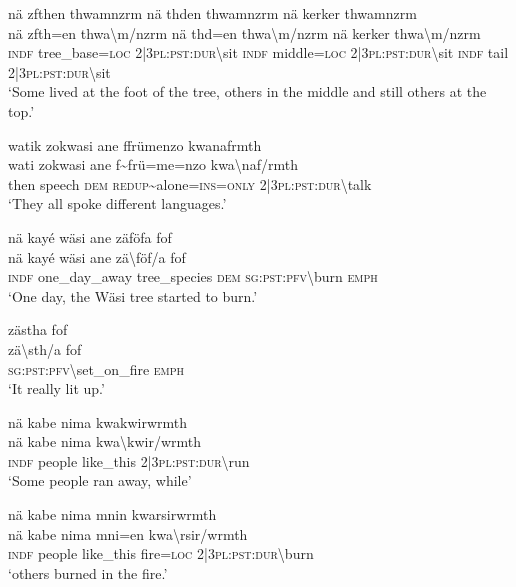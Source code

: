 \ea\label{ex:1:a3502}
nä zfthen thwamnzrm nä thden thwamnzrm nä kerker thwamnzrm\\
\gll nä	zfth=en	thwa{\textbackslash}m/nzrm	nä	thd=en	thwa{\textbackslash}m/nzrm	nä	kerker	thwa{\textbackslash}m/nzrm\\
     \textsc{indf}	tree\_base=\textsc{loc}	2|3\textsc{pl}:\textsc{pst}:\textsc{dur}{\textbackslash}sit	\textsc{indf}	middle=\textsc{loc}	2|3\textsc{pl}:\textsc{pst}:\textsc{dur}{\textbackslash}sit	\textsc{indf}	tail	2|3\textsc{pl}:\textsc{pst}:\textsc{dur}{\textbackslash}sit\\
\glt `Some lived at the foot of the tree, others in the middle and still others at the top.'
\z

\ea\label{ex:1:a3504}
watik zokwasi ane ffrümenzo kwanafrmth\\
\gll wati	zokwasi	ane	f{\textasciitilde}frü=me=nzo	kwa{\textbackslash}naf/rmth\\
     then	speech	\textsc{dem}	\textsc{redup}{\textasciitilde}alone=\textsc{ins}=\textsc{only}	2|3\textsc{pl}:\textsc{pst}:\textsc{dur}{\textbackslash}talk\\
\glt `They all spoke different languages.'
\z

\ea\label{ex:1:a3505}
nä kayé wäsi ane zäföfa fof\\
\gll nä	kayé	wäsi	ane	zä{\textbackslash}föf/a	fof\\
     \textsc{indf}	one\_day\_away	tree\_species	\textsc{dem}	\textsc{sg}:\textsc{pst}:\textsc{pfv}{\textbackslash}burn	\textsc{emph}\\
\glt `One day, the Wäsi tree started to burn.'
\z

\ea\label{ex:1:a3507}
zästha fof\\
\gll zä{\textbackslash}sth/a	fof\\
     \textsc{sg}:\textsc{pst}:\textsc{pfv}{\textbackslash}set\_on\_fire	\textsc{emph}\\
\glt `It really lit up.'
\z

\ea\label{ex:1:a3508}
nä kabe nima kwakwirwrmth\\
\gll nä	kabe	nima	kwa{\textbackslash}kwir/wrmth\\
     \textsc{indf}	people	like\_this	2|3\textsc{pl}:\textsc{pst}:\textsc{dur}{\textbackslash}run\\
\glt `Some people ran away, while'
\z

\ea\label{ex:1:a3509}
nä kabe nima mnin kwarsirwrmth\\
\gll nä	kabe	nima	mni=en	kwa{\textbackslash}rsir/wrmth\\
     \textsc{indf}	people	like\_this	fire=\textsc{loc}	2|3\textsc{pl}:\textsc{pst}:\textsc{dur}{\textbackslash}burn\\
\glt `others burned in the fire.'
\z

